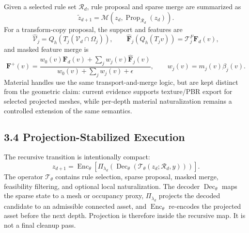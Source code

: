 Given a selected rule set \(\mathcal R_d\), rule proposal and sparse merge are
summarized as
\begin{equation}
\tilde z_{d+1}=\mathcal M(z_d,\operatorname{Prop}_{\mathcal R_d}(z_d)).
\end{equation}
For a transform-copy proposal, the support and features are
\begin{equation}
\widehat{\mathcal V}_j=Q_h(T_j(\mathcal V_d\cap\Omega_j)),\qquad
\widehat{\mathbf F}_j(Q_h(T_jv))=\mathcal T_j^F\mathbf F_d(v),
\end{equation}
and masked feature merge is
\begin{equation}
\mathbf F^+(v)=
\frac{w_0(v)\mathbf F_d(v)+\sum_j w_j(v)\widehat{\mathbf F}_j(v)}
{w_0(v)+\sum_jw_j(v)+\epsilon},
\qquad
w_j(v)=m_j(v)\beta_j(v).
\end{equation}
Material handles use the same transport-and-merge logic, but are kept distinct
from the geometric claim: current evidence supports texture/PBR export for
selected projected meshes, while per-depth material naturalization remains a
controlled extension of the same semantics.

\subsection*{3.4 Projection-Stabilized Execution}

The recursive transition is intentionally compact:
\begin{equation}
z_{d+1}=
\operatorname{Enc}_{\theta}
\left[
\Pi_{\lambda_d}
\left(
\operatorname{Dec}_{\theta}
\left(
\mathcal T_{\theta}(z_d;\mathcal R_d,y)
\right)
\right)
\right].
\label{eq:compact-recursive-transition-draft}
\end{equation}
The operator \(\mathcal T_{\theta}\) contains rule selection, sparse proposal,
masked merge, feasibility filtering, and optional local naturalization. The
decoder \(\operatorname{Dec}_{\theta}\) maps the sparse state to a mesh or
occupancy proxy, \(\Pi_{\lambda_d}\) projects the decoded candidate to an
admissible connected asset, and \(\operatorname{Enc}_{\theta}\) re-encodes the
projected asset before the next depth. Projection is therefore inside the
recursive map. It is not a final cleanup pass.

